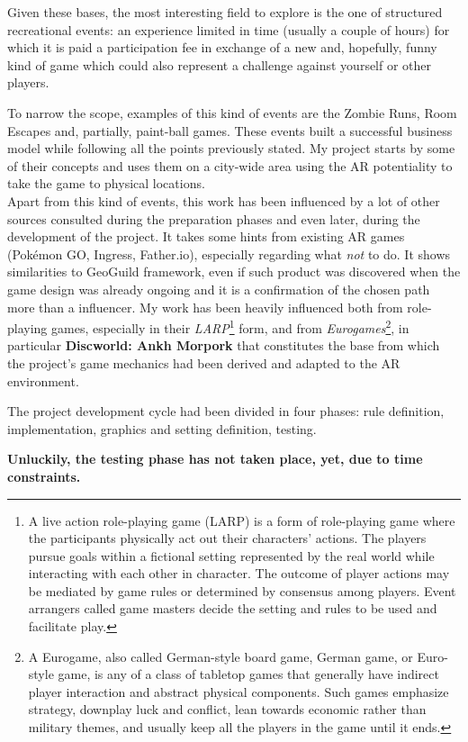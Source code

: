 	Given these bases, the most interesting field to explore is the one of structured recreational events: an experience limited in time (usually a couple of hours) for which it is paid a participation fee in exchange of a new and, hopefully, funny kind of game which could also represent a challenge against yourself or other players.
	
	To narrow the scope, examples of this kind of events are the Zombie Runs, Room Escapes and, partially, paint-ball games. These events built a successful business model while following all the points previously stated.
	My project starts by some of their concepts and uses them on a city-wide area using the AR potentiality to take the game to physical locations. \\
	
	Apart from this kind of events, this work has been influenced by a lot of other sources consulted during the preparation phases and even later, during the development of the project.
	It takes some hints from existing AR games (Pokémon GO, Ingress, Father.io), especially regarding what \emph{not} to do.
	It shows similarities to GeoGuild\cite{ionescu:geoguild} framework, even if such product was discovered when the game design was already ongoing and it is a confirmation of the chosen path more than a influencer.
	My work has been heavily influenced both from role-playing games, especially in their \emph{LARP}\footnote{A live action role-playing game (LARP) is a form of role-playing game where the participants physically act out their characters' actions. The players pursue goals within a fictional setting represented by the real world while interacting with each other in character. The outcome of player actions may be mediated by game rules or determined by consensus among players. Event arrangers called game masters decide the setting and rules to be used and facilitate play.\cite{wiki:larp}} form, and from \emph{Eurogames}\footnote{A Eurogame, also called German-style board game, German game, or Euro-style game, is any of a class of tabletop games that generally have indirect player interaction and abstract physical components. Such games emphasize strategy, downplay luck and conflict, lean towards economic rather than military themes, and usually keep all the players in the game until it ends.\cite{wiki:eurogame}}, in particular \textbf{Discworld: Ankh Morpork} that constitutes the base from which the project's game mechanics had been derived and adapted to the AR environment.
	
	The project development cycle had been divided in four phases: rule definition, implementation, graphics and setting definition, testing.
	
	\textbf{Unluckily, the testing phase has not taken place, yet, due to time constraints.}